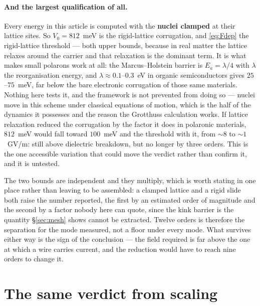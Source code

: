 \documentclass[11pt]{article}
\begin{document}
\paragraph{And the largest qualification of all.} Every energy in this article is computed
with the \textbf{nuclei clamped} at their lattice sites. So $V_0=812$~meV is the rigid-lattice
corrugation, and \eqref{eq:Fdep} the rigid-lattice threshold --- both upper bounds, because in real
matter the lattice relaxes around the carrier and that relaxation is the dominant term. It is what
makes small polarons work at all: the Marcus--Holstein barrier is $E_a=\lambda/4$ with $\lambda$ the
reorganisation energy, and $\lambda\approx0.1$--$0.3$~eV in organic semiconductors gives
$25$--$75$~meV, far below the bare electronic corrugation of those same materials. Nothing here
tests it, and the framework is not prevented from doing so --- nuclei move in this scheme under
classical equations of motion, which is the half of the dynamics it possesses and the reason the
Grotthuss calculation works. If lattice relaxation reduced the corrugation by the factor it does in
polaronic materials, $812$~meV would fall toward $100$~meV and the threshold with it, from
${\sim}8$ to ${\sim}1$~GV/m: still above dielectric breakdown, but no longer by three orders. This
is the one accessible variation that could move the verdict rather than confirm it, and it is
untested.

The two bounds are independent and they multiply, which is worth stating in one place rather than
leaving to be assembled: a clamped lattice and a rigid slide both raise the number reported, the
first by an estimated order of magnitude and the second by a factor nobody here can quote, since the
kink barrier is the quantity \S\ref{sec:mesh} shows cannot be extracted. Twelve orders is therefore
the separation for the mode measured, not a floor under every mode. What survives either way is the
sign of the conclusion --- the field required is far above the one at which a wire carries current,
and the reduction would have to reach nine orders to change it.

\section{The same verdict from scaling}\label{sec:scaling}
\end{document}
